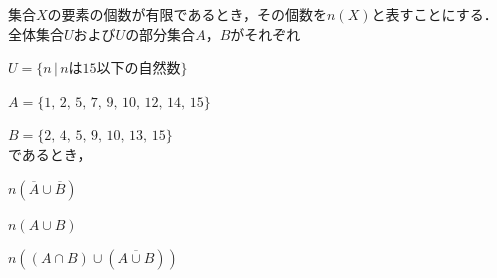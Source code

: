 \documentclass[../../../../uem_mat_mei_q.tex]{subfiles}
\begin{document}
    集合$X$の要素の個数が有限であるとき，その個数を$n(X)$と表すことにする．%
    全体集合$U$および$U$の部分集合$A$，$B$がそれぞれ

    \myspaceb%
    $U=\{n\,|\,\text{$n$は15以下の自然数}\}$

    \myspaceb%
    $A=\{1,\,2,\,5,\,7,\,9,\,10,\,12,\,14,\,15\}$
    
    \myspaceb%
    $B=\{2,\,4,\,5,\,9,\,10,\,13,\,15\}$\\
    であるとき，

    \myspacea$n(\overline{A}\cup\overline{B})$

    \myspacea$n(A\cup B)$

    \myspacea$n((A\cap B)\cup(\overline{A\cup B}))$
\end{document}
